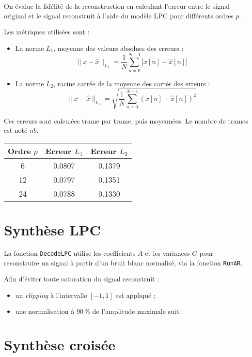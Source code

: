 \documentclass[11pt]{article}
\begin{document}
On évalue la fidélité de la reconstruction en calculant l’erreur entre le signal original et le signal reconstruit à l’aide du modèle LPC pour différents ordres \( p \).

Les métriques utilisées sont :
\begin{itemize}
    \item La norme \( L_1 \), moyenne des valeurs absolues des erreurs :
    \[
    \|x - \hat{x}\|_{L_1} = \frac{1}{N} \sum_{n=0}^{N-1} |x[n] - \hat{x}[n]|
    \]
    \item La norme \( L_2 \), racine carrée de la moyenne des carrés des erreurs :
    \[
    \|x - \hat{x}\|_{L_2} = \sqrt{ \frac{1}{N} \sum_{n=0}^{N-1} (x[n] - \hat{x}[n])^2 }
    \]
\end{itemize}

Ces erreurs sont calculées trame par trame, puis moyennées. Le nombre de trames est noté \( nb \).

\begin{center}
\begin{tabular}{|c|c|c|}
\hline
Ordre \( p \) & Erreur \( L_1 \) & Erreur \( L_2 \) \\
\hline
6 & 0.0807 & 0.1379 \\
12 & 0.0797 & 0.1351 \\
24 & 0.0788 & 0.1330 \\
\hline
\end{tabular}
\end{center}

\section{Synthèse LPC}

La fonction \texttt{DecodeLPC} utilise les coefficients \( A \) et les variances \( G \) pour reconstruire un signal à partir d’un bruit blanc normalisé, via la fonction \texttt{RunAR}.

Afin d’éviter toute saturation du signal reconstruit :
\begin{itemize}
    \item un \textit{clipping} à l’intervalle \([-1, 1]\) est appliqué ;
    \item une normalisation à 90\,\% de l’amplitude maximale suit.
\end{itemize}

\section{Synthèse croisée}
\end{document}
